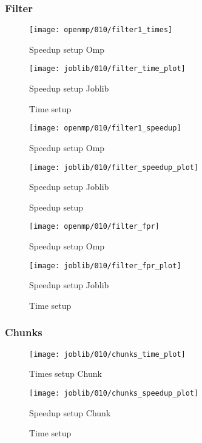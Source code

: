\subsubsection{Filter}\label{subsubsec:fpr-010-filter}
\begin{figure}[H]
    \centering
    \texttt{[image: openmp/010/filter1\_times]}
        \caption{Speedup setup Omp}\label{fig:010-filter_time_omp}
    \endminipage\hfill
    \texttt{[image: joblib/010/filter\_time\_plot]}
        \caption{Speedup setup Joblib}\label{fig:010-filter_time_joblib}
    \endminipage\hfill
    \caption{Time setup}
\end{figure}
\begin{figure}[H]
    \centering
    \texttt{[image: openmp/010/filter1\_speedup]}
        \caption{Speedup setup Omp}\label{fig:010-filter_speedup_omp}
    \endminipage\hfill
    \texttt{[image: joblib/010/filter\_speedup\_plot]}
        \caption{Speedup setup Joblib}\label{fig:010-filter_speedup_joblib}
    \endminipage\hfill
    \caption{Speedup setup}
\end{figure}
\begin{figure}[H]
    \centering
    \texttt{[image: openmp/010/filter\_fpr]}
        \caption{Speedup setup Omp}\label{fig:010-filter_fpr_omp}
    \endminipage\hfill
    \texttt{[image: joblib/010/filter\_fpr\_plot]}
        \caption{Speedup setup Joblib}\label{fig:010-filter_fpr_joblib}
    \endminipage\hfill
    \caption{Time setup}
\end{figure}

\subsubsection{Chunks}\label{subsubsec:010-chunks}
\begin{figure}[H]
    \centering
    \texttt{[image: joblib/010/chunks\_time\_plot]}
        \caption{Times setup Chunk}\label{fig:010-chunks_time}
    \endminipage\hfill
    \texttt{[image: joblib/010/chunks\_speedup\_plot]}
        \caption{Speedup setup Chunk}\label{fig:010-chunks_speedup}
    \endminipage\hfill
    \caption{Time setup}
\end{figure}


